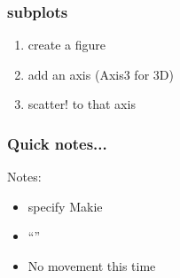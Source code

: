 \documentclass{beamer}
\begin{document}
\begin{frame}[fragile]
\frametitle{subplots}

\begin{enumerate}
\item create a figure
\item add an axis (Axis3 for 3D)
\item scatter! to that axis
\end{enumerate}

\end{frame}

\begin{frame}
\frametitle{Quick notes...}
Notes:
\begin{itemize}
\item specify Makie
\item ``\!''
\item No movement this time\!
\end{itemize}
\end{frame}
\end{document}
